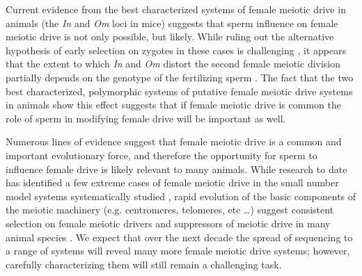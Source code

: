 \documentclass[12pt,letterpaper]{article}
\begin{document}
Current evidence from the best characterized systems of female meiotic drive in animals 
	(the  \emph{In} and \emph{Om} loci in mice) 
	suggests that sperm influence on female meiotic drive is not only possible, but likely. 
 While ruling out the alternative hypothesis of early selection on zygotes in these cases is challenging  \citep[see pages 52-54 in][ for comment]{Burt2006}, it appears that the extent to which \emph{In} and \emph{Om} distort the second female meiotic division partially depends on the 	
	genotype of the fertilizing sperm \citep{Agulnik1993,Wu2005}. 
The fact that the two best characterized, polymorphic systems of putative female 
	meiotic drive systems in animals 
	show this effect suggests that if female meiotic drive is common 
	the role of sperm in modifying female drive will be important as well.  \newline

Numerous lines of evidence suggest that female meiotic drive is a common and important 
	evolutionary force, and therefore the opportunity for sperm to influence female drive is likely relevant to many animals.    
While research to date has identified a few extreme cases of female meiotic 
	drive in the small number model systems systematically
        studied \citep{Agulnik1990, Fishman2008, Hiatt2003,Novitski1951, Pardo-ManuelDeVillena2001c},
	rapid evolution of the basic components of the meiotic machinery (e.g. centromeres, telomeres, etc \dots) 
	suggest consistent selection on female meiotic drivers and suppressors of meiotic drive in many animal species 
	 \citep[e.g. ][]{Anderson2008, Anderson2009, Axelsson2010, Malik2009a}. 
 We expect that over the next decade the spread of sequencing to a
         range of systems will reveal many more female meiotic drive
         systems; however, carefully characterizing them will still
         remain a challenging task. 
\newline
\end{document}
